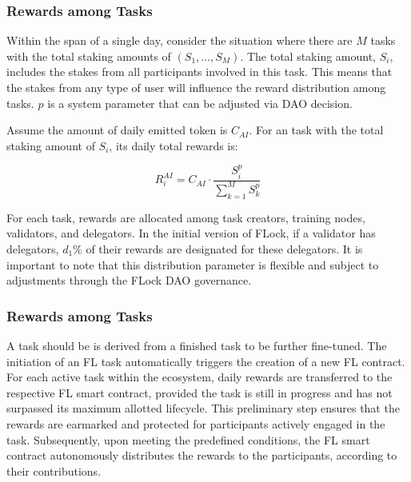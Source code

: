 \documentclass[conference]{IEEEtran}
\begin{document}



\subsubsection{Rewards among \SNT Tasks}

Within the span of a single day, consider the situation where there are $M$ \SNT tasks with the total staking amounts of $(S_1, \ldots, S_M)$. The total staking amount, $S_i$, includes the stakes from all participants involved in this task. This means that the stakes from any type of user will influence the reward distribution among tasks.
$p$  is a system parameter that can be adjusted via DAO decision.

Assume the amount of daily emitted \FML token is $C_{AI}$. For an \SNT task with the total staking amount of $S_i$, its daily total rewards is: 
        
$$R^{AI}_i = C_{AI} \cdot \frac{S^p_i}{\sum_{k=1}^{M}{S^p_k} }$$

 For each \SNT task, rewards are allocated among task creators, training nodes, validators, and delegators. In the initial version of FLock,  if a validator has delegators, $d_1\%$ of their rewards are designated for these delegators. It is important to note that this distribution parameter is flexible and subject to adjustments through the FLock DAO governance.




\subsubsection{Rewards among \FL Tasks} A \FL task should be is derived from a finished \SNT task to be further fine-tuned.  The initiation  of an FL task automatically triggers the creation of a new FL contract. 
For each active \FL task within the ecosystem, daily rewards are transferred  to the respective FL smart contract, provided the task is still in progress and has not surpassed its maximum allotted lifecycle. This preliminary step ensures that the rewards are earmarked and protected for participants actively engaged in the task. Subsequently, upon meeting the predefined conditions, the FL smart contract autonomously distributes the rewards to the participants, according to their contributions. 
\end{document}
